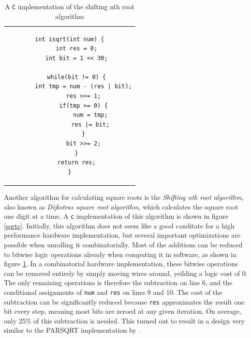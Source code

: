 			\begin{table}
				\centering
				\caption{A \texttt{C} implementation of the shifting nth root 
					algorithm}
				\label{sqrtcopt}
				\begin{tabular}{c}
				\begin{lstlisting}
int isqrt(int num) {
    int res = 0;
    int bit = 1 << 30;

    while(bit != 0) {
    	int tmp = num - (res | bit);
    	res >>= 1;
        if(tmp >= 0) {
            num = tmp;
            res |= bit;
        }
        bit >>= 2;
    }
    return res;
}
				\end{lstlisting}
				\end{tabular}
			\end{table}

			Another algorithm for calculating square roots is the
			\emph{Shifting nth root algorithm}, also known as \emph{Dijkstras
			square root algorithm}, which calculates the square root one digit
			at a time. A \texttt{c} implementation of this algorithm is shown
			in figure \ref{sqrtc}. Initially, this algorithm does not seem like
			a good canditate for a high performance hardware implementation,
			but several important optimizations are possible when unrolling it
			combinatorially. Most of the additions can be reduced to bitwise
			logic operations already when computing it in software, as shown in
			figure \ref{sqrtcopt}. In a combinatorial hardware implementation,
			these bitwise operations can be removed entirely by simply moving
			wires around, yeilding a logic cost of 0. The only remaining
			operations is therefore the subtraction on line 6, and the
			conditional assignments of \texttt{num} and \texttt{res} on lines 9
			and 10. The cost of the subtraction can be significantly reduced
			because \texttt{res} approximates the result one bit every step,
			meaning most bits are zeroed at any given iteration. On average,
			only 25\% of this subtraction is needed. This turned out to result
			in a design very similar to the PARSQRT implementation by
			\cite{japaneseSQRT}.
